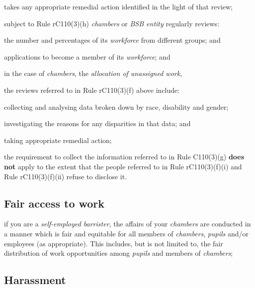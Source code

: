 \begin{numlist}
\begin{alphlist}
\begin{romlist}
\item takes any appropriate remedial action identified in the light of
that review;
\end{romlist}
\item subject to Rule rC110(3)(h) \emph{chambers} or \emph{BSB entity}
regularly reviews:
\begin{romlist}
\item the number and percentages of its \emph{workforce} from different
groups; and

\item applications to become a member of its \emph{workforce}; and

\item in the case of \emph{chambers}, the \emph{allocation of unassigned
work},
\end{romlist}
\item the reviews referred to in Rule rC110(3)(f) above include:
\begin{romlist}
\item collecting and analysing data broken down by race, disability and
gender;

\item investigating the reasons for any disparities in that data; and

\item taking appropriate remedial action;
\end{romlist}
\item the requirement to collect the information referred to in Rule
C110(3)(g) \textcolor{myred}{\textbf{does not}} apply to the extent that the people referred to in
Rule rC110(3)(f)(i) and Rule rC110(3)(f)(ii) refuse to disclose it.

\subsection{Fair access to work}

\item if you are a \emph{self-employed barrister}, the affairs of your
\emph{chambers} are conducted in a manner which is fair and equitable
for all members of \emph{chambers}, \emph{pupils} and/or employees (as
appropriate). This includes, but is not limited to, the fair
distribution of work opportunities among \emph{pupils} and members of
\emph{chambers};

\subsection{Harassment}


\end{alphlist}
\end{numlist}
